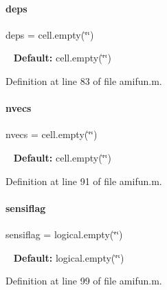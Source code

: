\paragraph{\texorpdfstring{deps}{deps}}
{\footnotesize\ttfamily deps = cell.\+empty(\char`\"{}\char`\"{})}

~\newline
{\bfseries Default\+:} cell.\+empty(\char`\"{}\char`\"{}) 

Definition at line 83 of file amifun.\+m.

\mbox{\label{classamifun_a019d960f3d1c1c819a7f3fc90f952c4b}} 
\paragraph{\texorpdfstring{nvecs}{nvecs}}
{\footnotesize\ttfamily nvecs = cell.\+empty(\char`\"{}\char`\"{})}

~\newline
{\bfseries Default\+:} cell.\+empty(\char`\"{}\char`\"{}) 

Definition at line 91 of file amifun.\+m.

\mbox{\label{classamifun_ad8930a02bca1d5facc6203b722d5349d}} 
\paragraph{\texorpdfstring{sensiflag}{sensiflag}}
{\footnotesize\ttfamily sensiflag = logical.\+empty(\char`\"{}\char`\"{})}

~\newline
{\bfseries Default\+:} logical.\+empty(\char`\"{}\char`\"{}) 

Definition at line 99 of file amifun.\+m.

